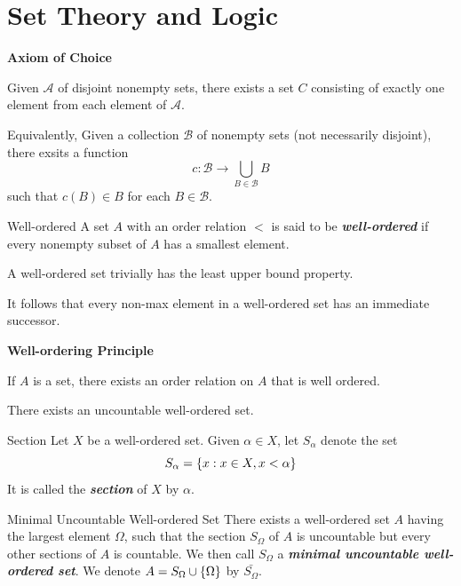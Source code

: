 \documentclass[12pt,a4paper]{article}
\begin{document}
    \maketitle
    \newpage
    \tableofcontents    
    \newpage

    \section{Set Theory and Logic}
    \begin{thm}\textbf{Axiom of Choice}\hfill
    
        Given $\mathcal{A}$ of disjoint nonempty sets, there exists a set $C$ consisting of exactly one element from each element of $\mathcal{A}$.
    \end{thm}
    \begin{remark}
        Equivalently, Given a collection $\mathcal{B}$ of nonempty sets (not necessarily disjoint), there exsits a function
        $$
        c: \mathcal{B}\to\bigcup_{B\in\mathcal{B}}B
        $$
        such that $c(B)\in B$ for each $B\in\mathcal{B}$.
    \end{remark}
    \hfill

    \begin{defi}{Well-ordered}
        A set $A$ with an order relation $<$ is said to be \textit{\textbf{well-ordered}} if every nonempty subset of $A$ has a smallest element.
    \end{defi}
    \begin{remark}
        A well-ordered set trivially has the least upper bound property. 
    \end{remark}
    \begin{remark}
        It follows that every non-max element in a well-ordered set has an immediate successor. 
    \end{remark}
    \begin{thm}\textbf{Well-ordering Principle}\hfill
    
        If $A$ is a set, there exists an order relation on $A$ that is well ordered.
    \end{thm}
    \begin{cor}
        There exists an uncountable well-ordered set.
    \end{cor}
    \hfill

    \begin{defi}{Section}
        Let $X$ be a well-ordered set. Given $\alpha\in X$, let $S_\alpha$ denote the set
        $$
        S_\alpha=\left\{x:x\in X,x<\alpha\right\}
        $$
        It is called the \textbf{\textit{section}} of $X$ by $\alpha$.
    \end{defi}
    \begin{defi}{Minimal Uncountable Well-ordered Set}
        There exists a well-ordered set $A$ having the largest element $\Omega$, such that the section $S_\Omega$ of $A$ is uncountable but every other sections of $A$ is countable. We then call $S_\Omega$ a \textbf{\textit{minimal uncountable well-ordered set}}. We denote $A=S_\Omega\cup\left\{\Omega\right\}$ by $\bar{S_\Omega}$.
    \end{defi}
    \hfill
\end{document}
